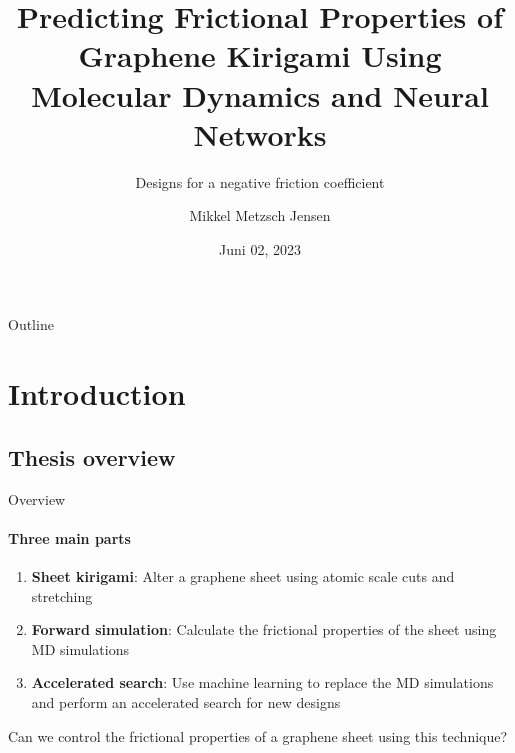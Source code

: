 \documentclass[
	10pt, %
]{beamer}
\title[Predicting Graphene Kirigami Friction]{Predicting Frictional Properties of Graphene Kirigami Using Molecular Dynamics and Neural Networks}
\subtitle{Designs for a negative friction coefficient}
\author[Mikkel Metzsch Jensen]{Mikkel Metzsch Jensen}
\institute[UiO]{University of Oslo}
\date[Juni 02, 2023]{Juni 02, 2023}
\begin{document}

\begin{frame}
	\titlepage %
\end{frame}


\begin{frame}{Outline}
    \tableofcontents
\end{frame}
%
%
\section{Introduction} %
\subsection{Thesis overview}
\begin{frame}{Overview}
	\framesubtitle{Three main parts}
	\begin{enumerate}
		\setlength\itemsep{1em}
		\item \textbf{Sheet kirigami}: Alter a graphene sheet using atomic scale cuts and stretching
		\item \textbf{Forward simulation}: Calculate the frictional properties of the sheet using MD simulations
		\item \textbf{Accelerated search}: Use machine learning to replace the MD simulations and perform an accelerated search for new designs
	\end{enumerate}
	\vspace{2mm}
	
	Can we control the frictional properties of a graphene sheet using this technique?
	
\end{frame}
%
%
\end{document}
